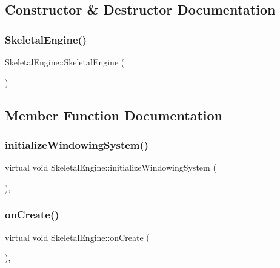 \subsection{Constructor \& Destructor Documentation}
\hypertarget{class_skeletal_engine_ac12b90e475584260e9fe507ea251b79f}{}\label{class_skeletal_engine_ac12b90e475584260e9fe507ea251b79f} 
\subsubsection{\texorpdfstring{Skeletal\+Engine()}{SkeletalEngine()}}
{\footnotesize\ttfamily Skeletal\+Engine\+::\+Skeletal\+Engine (\begin{DoxyParamCaption}{ }\end{DoxyParamCaption})\hspace{0.3cm}{\ttfamily [inline]}}



\subsection{Member Function Documentation}
\hypertarget{class_skeletal_engine_ab59e698fe322bf4e600b4e3b5cf62427}{}\label{class_skeletal_engine_ab59e698fe322bf4e600b4e3b5cf62427} 
\subsubsection{\texorpdfstring{initialize\+Windowing\+System()}{initializeWindowingSystem()}}
{\footnotesize\ttfamily virtual void Skeletal\+Engine\+::initialize\+Windowing\+System (\begin{DoxyParamCaption}{ }\end{DoxyParamCaption})\hspace{0.3cm}{\ttfamily [inline]}, {\ttfamily [virtual]}}

\hypertarget{class_skeletal_engine_aa947bae905c4e4628bfe5036b4943a08}{}\label{class_skeletal_engine_aa947bae905c4e4628bfe5036b4943a08} 
\subsubsection{\texorpdfstring{on\+Create()}{onCreate()}}
{\footnotesize\ttfamily virtual void Skeletal\+Engine\+::on\+Create (\begin{DoxyParamCaption}{ }\end{DoxyParamCaption})\hspace{0.3cm}{\ttfamily [inline]}, {\ttfamily [virtual]}}



